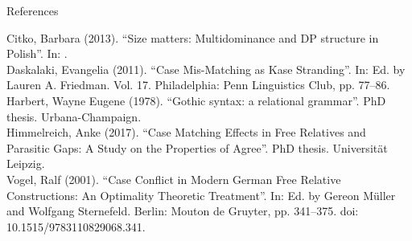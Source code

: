 \documentclass[xcolor=dvipsnames,10pt]{beamer}
\begin{document}
\begin{frame}[t]{References}

Citko, Barbara (2013). “Size matters: Multidominance and DP structure in Polish”. In: .\\
Daskalaki, Evangelia (2011). “Case Mis-Matching as Kase Stranding”. In:  Ed. by Lauren A. Friedman. Vol. 17. Philadelphia: Penn Linguistics Club, pp. 77–86.\\
Harbert, Wayne Eugene (1978). “Gothic syntax: a relational grammar”. PhD thesis. Urbana-Champaign.\\
Himmelreich, Anke (2017). “Case Matching Effects in Free Relatives and Parasitic Gaps: A Study on the Properties of Agree”. PhD thesis. Universität Leipzig.\\
Vogel, Ralf (2001). “Case Conflict in Modern German Free Relative Constructions: An Optimality Theoretic Treatment”. In:  Ed. by Gereon Müller and Wolfgang Sternefeld. Berlin: Mouton de Gruyter, pp. 341–375. doi: 10.1515/9783110829068.341.

\end{frame}
\end{document}
